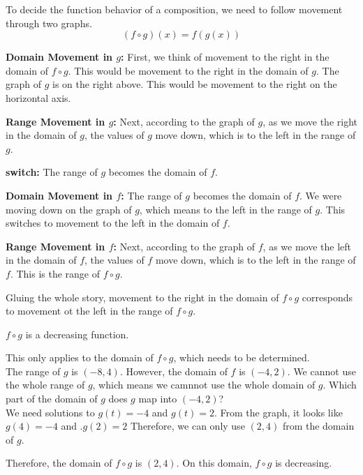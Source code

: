 \documentclass{ximera}
\begin{document}
To decide the function behavior of a composition, we need to follow movement through two graphs. \\



\[
(f \circ g)(x) = f(g(x))
\]



\textbf{\textcolor{blue!55!black}{Domain Movement in $g$:}}  First, we think of movement to the right in the domain of $f \circ g$.  This would be movement to the right in the domain of $g$.  The graph of $g$ is on the right above.  This would be movement to the right on the horizontal axis.



\textbf{\textcolor{blue!55!black}{Range Movement in $g$:}}  Next, according to the graph of $g$, as we move the right in the domain of $g$, the values of $g$ move down, which is to the left in the range of $g$.




\textbf{\textcolor{blue!55!black}{switch:}}   The range of $g$ becomes the domain of $f$.  


\textbf{\textcolor{blue!55!black}{Domain Movement in $f$:}}   The range of $g$ becomes the domain of $f$.  We were moving down on the graph of $g$, which means to the left in the range of $g$.  This switches to movement to the left in the domain of $f$.


\textbf{\textcolor{blue!55!black}{Range Movement in $f$:}}  Next, according to the graph of $f$, as we move the left in the domain of $f$, the values of $f$ move down, which is to the left in the range of $f$.  This is the range of $f \circ g$.




Gluing the whole story, movement to the right in the domain of $f \circ g$ corresponds to movement ot the left in the range of $f \circ g$.

$f \circ g$ is a decreasing function.



\begin{observation}


This only applies to the domain of $f \circ g$, which needs to be determined. \\



The range of $g$ is $(-8, 4)$.  However, the domain of $f$ is $(-4, 2)$.   We cannot use the whole range of $g$, which means we camnnot use the whole domain of $g$.  Which part of the domain of $g$ does $g$ map into $(-4, 2)$? \\


We need solutions to $g(t) = -4$ and $g(t) = 2$.  From the graph, it looks like $g(4) = -4$  and .$g(2) = 2$  Therefore, we can only use $(2, 4)$ from the domain of $g$.


Therefore, the domain of $f \circ g$ is $(2, 4)$.  On this domain, $f \circ g$ is decreasing.



\end{observation}
\end{document}
